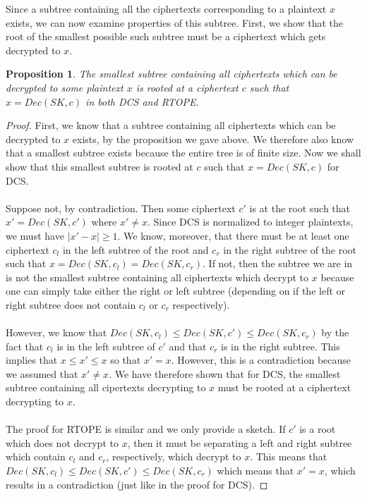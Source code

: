 \documentclass[12pt]{article}
\newtheorem{proposition}[theorem]{Proposition}
\begin{document}
Since a subtree containing all the ciphertexts corresponding to a plaintext $x$ exists, we can now examine properties of this subtree. First, we show that the root of the smallest possible such subtree must be a ciphertext which gets decrypted to $x$. \\

\begin{proposition}
  The smallest subtree containing all ciphertexts which can be decrypted to some plaintext $x$ is rooted at a ciphertext $c$ such that $x = Dec(SK, c)$ in both DCS and RTOPE.
\end{proposition}
\begin{proof}
  First, we know that a subtree containing all ciphertexts which can be decrypted to $x$ exists, by the proposition we gave above. We therefore also know that a smallest subtree exists because the entire tree is of finite size. Now we shall show that this smallest subtree is rooted at $c$ such that $x = Dec(SK, c)$ for DCS. \\ \\
Suppose not, by contradiction. Then some ciphertext $c'$ is at the root such that $x' = Dec(SK, c')$ where $x' \neq x$. Since DCS is normalized to integer plaintexts, we must have $|x' - x| \geq 1$. We know, moreover, that there must be at least one ciphertext $c_l$ in the left subtree of the root and $c_r$ in the right subtree of the root such that $x = Dec(SK, c_l) = Dec(SK, c_r)$. If not, then the subtree we are in is not the smallest subtree containing all ciphertexts which decrypt to $x$ because one can simply take either the right or left subtree (depending on if the left or right subtree does not contain $c_l$ or $c_r$ respectively). \\ \\
However, we know that $Dec(SK, c_l) \leq Dec(SK, c') \leq Dec(SK, c_r)$ by the fact that $c_l$ is in the left subtree of $c'$ and that $c_r$ is in the right subtree. This implies that $x \leq x' \leq x$ so that $x' = x$. However, this is a contradiction because we assumed that $x' \neq x$. We have therefore shown that for DCS, the smallest subtree containing all cipertexts decrypting to $x$ must be rooted at a ciphertext decrypting to $x$. \\ \\
The proof for RTOPE is similar and we only provide a sketch. If $c'$ is a root which does not decrypt to $x$, then it must be separating a left and right subtree which contain $c_l$ and $c_r$, respectively, which decrypt to $x$. This means that $Dec(SK, c_l) \leq Dec(SK, c') \leq Dec(SK, c_r)$ which means that $x' = x$, which results in a contradiction (just like in the proof for DCS).
\end{proof}
\end{document}
